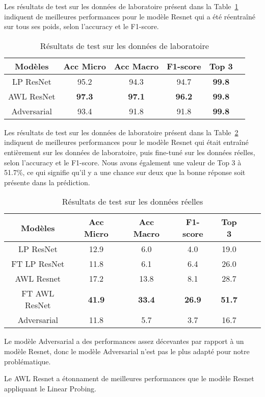 
Les résultats de test sur les données de laboratoire présent dans la Table~\ref{tab:results_lab} indiquent de meilleures performances pour le modèle Resnet qui a été réentraîné sur tous ses poids, selon l'accuracy et le F1-score. 

\begin{table}[ht]
  \centering
    \begin{tabular}{cccccc}
    \toprule
    Modèles & Acc Micro & Acc Macro & F1-score & Top 3 \\
    \midrule
    LP ResNet & 95.2 & 94.3 & 94.7 & \textbf{99.8} \\
    AWL ResNet & \textbf{97.3} & \textbf{97.1} & \textbf{96.2} & \textbf{99.8} \\
    Adversarial & 93.4 & 91.8 & 91.8 & \textbf{99.8} \\
    \bottomrule
    \end{tabular}
    \caption{Résultats de test sur les données de laboratoire}
    \label{tab:results_lab}
\end{table}

Les résultats de test sur les données de laboratoire présent dans la Table~\ref{tab: results_real} indiquent de meilleures performances pour le modèle Resnet qui était entraîné entièrement sur les données de laboratoire, puis fine-tuné sur les données réelles, selon l'accuracy et le F1-score. 
Nous avons également une valeur de Top 3 à 51.7\%, ce qui signifie qu'il y a une chance sur deux que la bonne réponse soit présente dans la prédiction. 

\begin{table}[ht]
  \centering
    \begin{tabular}{ccccccc}
    \toprule
    Modèles & Acc Micro & Acc Macro & F1-score & Top 3 \\
    \midrule
    LP ResNet & 12.9 & 6.0 & 4.0 & 19.0 \\
    FT LP ResNet & 11.8 & 6.1 & 6.4 & 26.0 \\
    AWL Resnet & 17.2 & 13.8 & 8.1 & 28.7 \\
    FT AWL ResNet & \textbf{41.9} & \textbf{33.4} & \textbf{26.9} & \textbf{51.7} \\
    Adversarial & 11.8 & 5.7 & 3.7 & 16.7 \\
    \bottomrule
    \end{tabular}
    \caption{Résultats de test sur les données réelles}
    \label{tab: results_real}
\end{table}

Le modèle Adversarial a des performances assez décevantes par rapport à un modèle Resnet, donc le modèle Adversarial n'est pas le plus adapté pour notre problématique.

Le AWL Resnet a étonnament de meilleures performances que le modèle Resnet appliquant le Linear Probing. 

